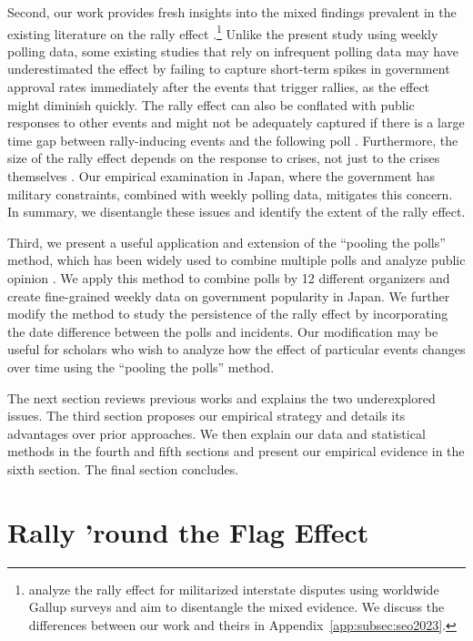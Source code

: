 \documentclass[letterpaper,12pt]{scrartcl}
\begin{document}
Second, our work provides fresh insights into the mixed findings prevalent in the existing literature on the rally effect \citep{newport2021}.\footnote{\citet{seo2023} analyze the rally effect for militarized interstate disputes using worldwide Gallup surveys and aim to disentangle the mixed evidence. We discuss the differences between our work and theirs in Appendix~\ref{app:subsec:seo2023}.} Unlike the present study using weekly polling data, some existing studies that rely on infrequent polling data may have underestimated the effect by failing to capture short-term spikes in government approval rates immediately after the events that trigger rallies, as the effect might diminish quickly. The rally effect can also be conflated with public responses to other events and might not be adequately captured if there is a large time gap between rally-inducing events and the following poll \citep{Oneal1995PolitBehav}. Furthermore, the size of the rally effect depends on the response to crises, not just to the crises themselves \citep{James1998PRQ}. Our empirical examination in Japan, where the government has military constraints, combined with weekly polling data, mitigates this concern. In summary, we disentangle these issues and identify the extent of the rally effect.

Third, we present a useful application and extension of the ``pooling the polls'' method, which has been widely used to combine multiple polls and analyze public opinion \citep{Jackman2005AustJPolitSci}. We apply this method to combine polls by 12 different organizers and create fine-grained weekly data on government popularity in Japan. We further modify the method to study the persistence of the rally effect by incorporating the date difference between the polls and incidents. Our modification may be useful for scholars who wish to analyze how the effect of particular events changes over time using the ``pooling the polls'' method.

The next section reviews previous works and explains the two underexplored issues. The third section proposes our empirical strategy and details its advantages over prior approaches. We then explain our data and statistical methods in the fourth and fifth sections and present our empirical evidence in the sixth section. The final section concludes.

\section*{Rally 'round the Flag Effect\centering}
\end{document}
